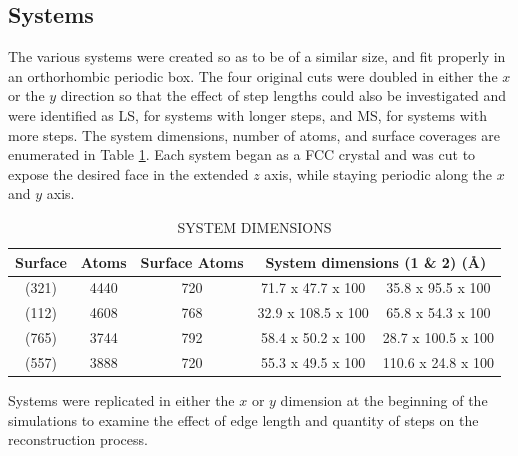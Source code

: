 \subsection{Systems}

The various  systems were created so as to be of a similar size, and fit
properly in an orthorhombic periodic box. The four original cuts were doubled
in either the $x$ or the $y$ direction so that the effect of step lengths could
also be investigated and were identified as LS, for systems with longer steps,
and MS, for systems with more steps. The system dimensions, number of atoms,
and surface coverages are enumerated in Table \ref{tab:dimensions}. Each system
began as a FCC crystal and was cut to expose the desired face in the extended
$z$ axis, while staying periodic along the $x$ and $y$ axis.

\begin{table}
\caption{SYSTEM DIMENSIONS}
\centering
\begin{threeparttable}
\centering
\begin{tabular}{c c c c c}
\hline\hline
Surface & Atoms & Surface Atoms & \multicolumn{2}{c}{System dimensions (1 \& 2) (\AA)}  \\ 
\hline
(321) & 4440 & 720 & 71.7 x 47.7 x 100 & 35.8 x 95.5 x 100\\
(112) & 4608 & 768 & 32.9 x 108.5 x 100 & 65.8 x 54.3 x 100\\
(765) & 3744 & 792 & 58.4 x 50.2 x 100 & 28.7 x 100.5 x 100\\
(557) & 3888 & 720 & 55.3 x 49.5 x 100 & 110.6 x 24.8 x 100\\
\hline
\hline
\end{tabular}
\begin{tablenotes}
  \item Systems were replicated in either the $x$ or $y$ dimension at the
beginning of the simulations to examine the effect of edge length and quantity
of steps on the reconstruction process.
\end{tablenotes}
\end{threeparttable}
\label{tab:dimensions}
\end{table}

